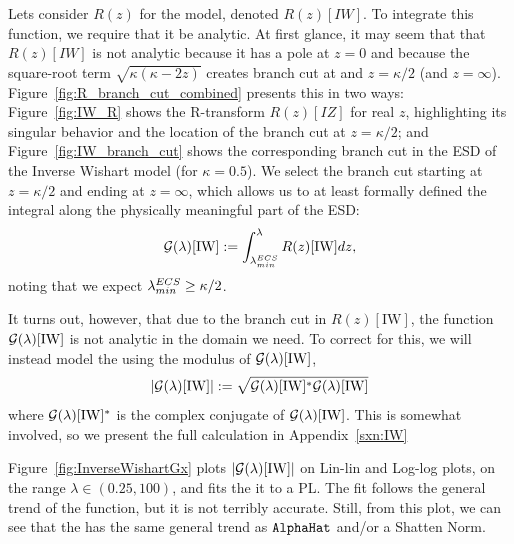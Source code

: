 Lets consider $R(z)$ for the \InverseWishart model, denoted $R(z)[IW]$.
To integrate this function, we require that it be analytic.
At first glance, it may seem that that $R(z)[IW]$ is not analytic because it
has a pole at $z=0$ and because the square-root term $\sqrt{\kappa(\kappa-2z)}$  creates branch
cut at and $z=\kappa/2$ (and $z=\infty$).
Figure~\ref{fig:R_branch_cut_combined} presents this in two ways:
Figure~\ref{fig:IW_R} shows the R-transform $R(z)[IZ]$ for real $z$, highlighting its singular behavior and the location of the branch cut at $z = \kappa/2$; and
Figure~\ref{fig:IW_branch_cut} shows the corresponding branch cut in the ESD of the Inverse Wishart model (for $\kappa = 0.5$).
We select the branch cut starting at $z=\kappa/2$ and ending at $z=\infty$,
which allows us to at least formally defined the integral along the physically meaningful part of the ESD:
\begin{equation}
\label{eqn:IW_model_1} 
\mathcal{G(\lambda)}[\mathrm{IW}] := \int_{\lambda^{ECS}_{min}}^{\lambda} R(z)[\mathrm{IW}] dz  ,
\end{equation}
noting that we expect $\lambda^{ECS}_{min}\ge\kappa/2$.

It turns out, however, that due to the branch cut in $R(z)[\mathrm{IW}]$,
the function $\mathcal{G(\lambda)}[\mathrm{IW}]$ is not analytic in the domain we need. 
To correct for this, we will instead model the \LayerQualitySquared using the modulus of $\mathcal{G(\lambda)}[\mathrm{IW}]$,
\begin{equation}
\label{eqn:IW_model_2} 
|\mathcal{G(\lambda)}[\mathrm{IW}]| := \sqrt{\mathcal{G(\lambda)}[\mathrm{IW}]^{*}\mathcal{G(\lambda)}[\mathrm{IW}]}
\end{equation}
where $\mathcal{G(\lambda)}[\mathrm{IW}]^{*}$ is the complex conjugate of $\mathcal{G(\lambda)}[\mathrm{IW}]$.
This is somewhat involved, so we present the full calculation in Appendix~\ref{sxn:IW}


Figure~\ref{fig:InverseWishartGx} plots $|\mathcal{G(\lambda)}[\mathrm{IW}]|$ on Lin-lin and Log-log plots, on the range $\lambda\in(0.25, 100)$, and fits the it to a PL. 
The fit follows the general trend of the function, but it is not terribly accurate.
Still, from this plot, we can see that the \LayerQualitySquared has the same general trend as $\texttt{AlphaHat}$ and/or a Shatten Norm.

